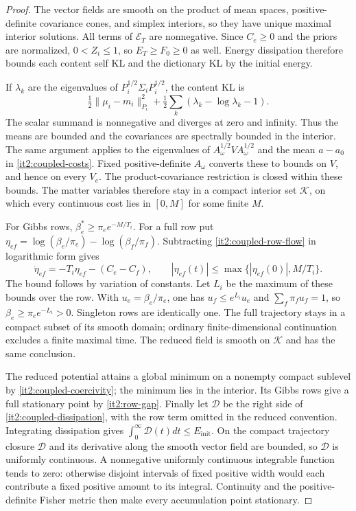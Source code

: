\begin{proof}
The vector fields are smooth on the product of mean spaces, positive-definite covariance cones, and simplex interiors, so they have unique maximal interior solutions. All terms of $\mathcal E_T$ are nonnegative. Since $C_e\geq0$ and the priors are normalized, $0<Z_i\leq1$, so $E_T\geq F_0\geq0$ as well. Energy dissipation therefore bounds each content self KL and the dictionary KL by the initial energy.

If $\lambda_k$ are the eigenvalues of $P_i^{1/2}\Sigma_iP_i^{1/2}$, the content KL is
\begin{equation}
 \tfrac12\|\mu_i-m_i\|_{P_i}^2+
 \tfrac12\sum_k(\lambda_k-\log\lambda_k-1).
 \label{it2:coupled-coercivity}
\end{equation}
The scalar summand is nonnegative and diverges at zero and infinity. Thus the means are bounded and the covariances are spectrally bounded in the interior. The same argument applies to the eigenvalues of $A_\omega^{1/2}VA_\omega^{1/2}$ and the mean $a-a_0$ in \cref{it2:coupled-costs}. Fixed positive-definite $A_\omega$ converts these to bounds on $V$, and hence on every $V_e$. The product-covariance restriction is closed within these bounds. The matter variables therefore stay in a compact interior set $\mathcal K$, on which every continuous cost lies in $[0,M]$ for some finite $M$.

For Gibbs rows, $\beta_e^*\geq\pi_e e^{-M/T_i}$. For a full row put $\eta_{ef}=\log(\beta_e/\pi_e)-\log(\beta_f/\pi_f)$. Subtracting \cref{it2:coupled-row-flow} in logarithmic form gives
\begin{equation}
 \dot\eta_{ef}=-T_i\eta_{ef}-(C_e-C_f),\qquad
 |\eta_{ef}(t)|\leq
 \max\{|\eta_{ef}(0)|,M/T_i\}.
 \label{it2:coupled-row-floor}
\end{equation}
The bound follows by variation of constants. Let $L_i$ be the maximum of these bounds over the row. With $u_e=\beta_e/\pi_e$, one has $u_f\leq e^{L_i}u_e$ and $\sum_f\pi_fu_f=1$, so $\beta_e\geq\pi_e e^{-L_i}>0$. Singleton rows are identically one. The full trajectory stays in a compact subset of its smooth domain; ordinary finite-dimensional continuation excludes a finite maximal time. The reduced field is smooth on $\mathcal K$ and has the same conclusion.

The reduced potential attains a global minimum on a nonempty compact sublevel by \cref{it2:coupled-coercivity}; the minimum lies in the interior. Its Gibbs rows give a full stationary point by \cref{it2:row-gap}. Finally let $\mathcal D$ be the right side of \cref{it2:coupled-dissipation}, with the row term omitted in the reduced convention. Integrating dissipation gives $\int_0^\infty\mathcal D(t)dt\leq E_{\mathrm{init}}$. On the compact trajectory closure $\mathcal D$ and its derivative along the smooth vector field are bounded, so $\mathcal D$ is uniformly continuous. A nonnegative uniformly continuous integrable function tends to zero: otherwise disjoint intervals of fixed positive width would each contribute a fixed positive amount to its integral. Continuity and the positive-definite Fisher metric then make every accumulation point stationary.


\end{proof}
